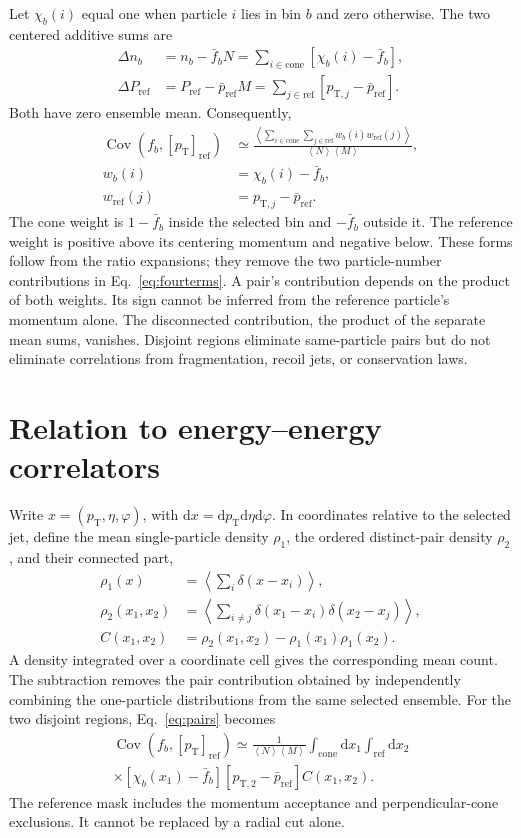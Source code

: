 \documentclass[aps,prc,twocolumn,superscriptaddress,nofootinbib,longbibliography,floatfix,10pt]{revtex4-2}
\newcommand{\pT}{p_{\mathrm T}}
\newcommand{\mpt}{[p_{\mathrm T}]_{\mathrm{ref}}}
\newcommand{\av}[1]{\left\langle #1\right\rangle}
\newcommand{\Cov}{\operatorname{Cov}}
\newcommand{\dd}{\mathrm d}
\begin{document}
Let $\chi_b(i)$ equal one when particle $i$ lies in bin $b$ and zero otherwise. The two centered additive sums are
\begin{align}
 \Delta n_b&=n_b-\bar f_bN=\sum_{i\in\mathrm{cone}}[\chi_b(i)-\bar f_b],\nonumber\\
 \Delta P_{\mathrm{ref}}&=P_{\mathrm{ref}}-\bar p_{\mathrm{ref}}M
 =\sum_{j\in\mathrm{ref}}[p_{\mathrm T,j}-\bar p_{\mathrm{ref}}].
 \label{eq:residuals}
\end{align}
Both have zero ensemble mean. Consequently,
\begin{align}
 \Cov(f_b,\mpt)&\simeq\frac{\av{\sum_{i\in\mathrm{cone}}\sum_{j\in\mathrm{ref}}w_b(i)w_{\mathrm{ref}}(j)}}{\av N\av M},\nonumber\\
 w_b(i)&=\chi_b(i)-\bar f_b,\nonumber\\
 w_{\mathrm{ref}}(j)&=p_{\mathrm T,j}-\bar p_{\mathrm{ref}}.
 \label{eq:pairs}
\end{align}
The cone weight is $1-\bar f_b$ inside the selected bin and $-\bar f_b$ outside it. The reference weight is positive above its centering momentum and negative below. These forms follow from the ratio expansions; they remove the two particle-number contributions in Eq.~\eqref{eq:fourterms}. A pair's contribution depends on the product of both weights. Its sign cannot be inferred from the reference particle's momentum alone. The disconnected contribution, the product of the separate mean sums, vanishes. Disjoint regions eliminate same-particle pairs but do not eliminate correlations from fragmentation, recoil jets, or conservation laws.

\section{Relation to energy--energy correlators}\label{sec:eec}
Write $x=(\pT,\eta,\varphi)$, with $\dd x=\dd\pT\dd\eta\dd\varphi$. In coordinates relative to the selected jet, define the mean single-particle density $\rho_1$, the ordered distinct-pair density $\rho_2$, and their connected part,
\begin{align}
 \rho_1(x)&=\av{\sum_i\delta(x-x_i)},\nonumber\\
 \rho_2(x_1,x_2)&=\av{\sum_{i\ne j}\delta(x_1-x_i)\delta(x_2-x_j)},\nonumber\\
 C(x_1,x_2)&=\rho_2(x_1,x_2)-\rho_1(x_1)\rho_1(x_2).
 \label{eq:density}
\end{align}
A density integrated over a coordinate cell gives the corresponding mean count. The subtraction removes the pair contribution obtained by independently combining the one-particle distributions from the same selected ensemble. For the two disjoint regions, Eq.~\eqref{eq:pairs} becomes
\begin{multline}
 \Cov(f_b,\mpt)\simeq\frac{1}{\av N\av M}
 \int_{\mathrm{cone}}\dd x_1\int_{\mathrm{ref}}\dd x_2\\
 \times[\chi_b(x_1)-\bar f_b]
 [p_{\mathrm T,2}-\bar p_{\mathrm{ref}}]C(x_1,x_2).
 \label{eq:corr}
\end{multline}
The reference mask includes the momentum acceptance and perpendicular-cone exclusions. It cannot be replaced by a radial cut alone.
\end{document}
